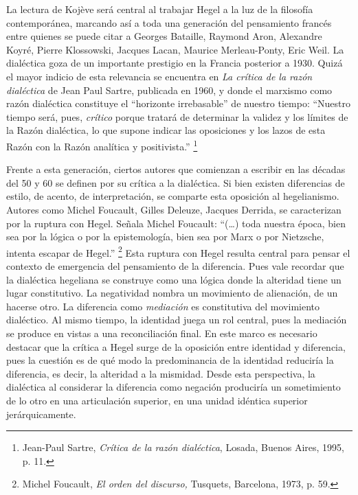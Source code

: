 \documentclass{book}
\begin{document}
La lectura de Kojève será central al trabajar Hegel a la luz de la
filosofía contemporánea, marcando así a toda una generación del
pensamiento francés entre quienes se puede citar a Georges Bataille,
Raymond Aron, Alexandre Koyré, Pierre Klossowski, Jacques Lacan, Maurice
Merleau-Ponty, Eric Weil. La dialéctica goza de un importante prestigio
en la Francia posterior a 1930. Quizá el mayor indicio de esta
relevancia se encuentra en \emph{La crítica de la razón dialéctica} de
Jean Paul Sartre, publicada en 1960, y donde el marxismo como razón
dialéctica constituye el \enquote{horizonte irrebasable} de nuestro tiempo:
\enquote{Nuestro tiempo será, pues, \emph{crítico} porque tratará de determinar
la validez y los límites de la Razón dialéctica, lo que supone indicar
las oposiciones y los lazos de esta Razón con la Razón analítica y
positivista.} \footnote{Jean-Paul Sartre, \emph{Crítica de la razón
  dialéctica}, Losada, Buenos Aires, 1995, p. 11.}

Frente a esta generación, ciertos autores que comienzan a escribir en
las décadas del 50 y 60 se definen por su crítica a la dialéctica. Si
bien existen diferencias de estilo, de acento, de interpretación, se
comparte esta oposición al hegelianismo. Autores como Michel Foucault,
Gilles Deleuze, Jacques Derrida, se caracterizan por la ruptura con
Hegel. Señala Michel Foucault: \enquote{(\dots) toda nuestra época, bien
sea por la lógica o por la epistemología, bien sea por Marx o por
Nietzsche, intenta escapar de Hegel.} \footnote{Michel Foucault, \emph{El
  orden del discurso,} Tusquets, Barcelona, 1973, p. 59.} Esta ruptura
con Hegel resulta central para pensar el contexto de emergencia del
pensamiento de la diferencia. Pues vale recordar que la dialéctica
hegeliana se construye como una lógica donde la alteridad tiene un lugar
constitutivo. La negatividad nombra un movimiento de alienación, de un
hacerse otro. La diferencia como \emph{mediación} es constitutiva del
movimiento dialéctico. Al mismo tiempo, la identidad juega un rol
central, pues la mediación se produce en vistas a una reconciliación
final. En este marco es necesario destacar que la crítica a Hegel surge
de la oposición entre identidad y diferencia, pues la cuestión es de qué
modo la predominancia de la identidad reduciría la diferencia, es decir,
la alteridad a la mismidad. Desde esta perspectiva, la dialéctica al
considerar la diferencia como negación produciría un sometimiento de lo
otro en una articulación superior, en una unidad idéntica superior
jerárquicamente.
\end{document}
